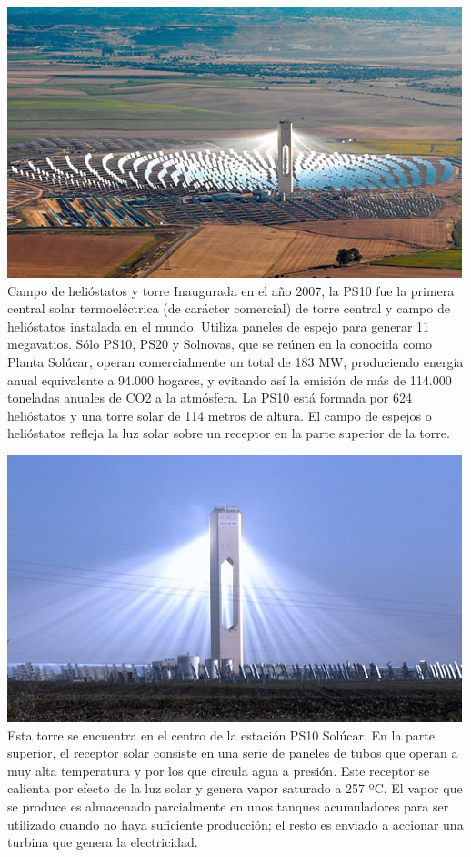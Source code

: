 \includegraphics[scale=1]{unnamed (3).jpg}
Campo de helióstatos y torre
Inaugurada en el año 2007, la PS10 fue la primera central solar termoeléctrica (de carácter comercial) de torre central y campo de helióstatos instalada en el mundo. Utiliza paneles de espejo para generar 11 megavatios.
Sólo PS10, PS20 y Solnovas, que se reúnen en la conocida como Planta Solúcar, operan comercialmente un total de 183 MW, produciendo energía anual equivalente a 94.000 hogares, y evitando así la emisión de más de 114.000 toneladas anuales de CO2 a la atmósfera.
La PS10 está formada por 624 helióstatos y una torre solar de 114 metros de altura. El campo de espejos o helióstatos refleja la luz solar sobre un receptor en la parte superior de la torre.

\includegraphics[scale=1]{unnamed (5).jpg}
Esta torre se encuentra en el centro de la estación PS10 Solúcar. En la parte superior, el receptor solar consiste en una serie de paneles de tubos que operan a muy alta temperatura y por los que circula agua a presión. Este receptor se calienta por efecto de la luz solar y genera vapor saturado a 257 ºC. El vapor que se produce es almacenado parcialmente en unos tanques acumuladores para ser utilizado cuando no haya suficiente producción; el resto es enviado a accionar una turbina que genera la electricidad.

